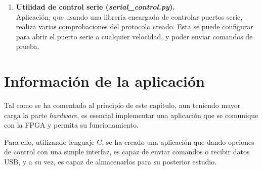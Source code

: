\begin{enumerate}
    \item \textbf{Utilidad de control serie (\emph{serial\_control.py}).} \\
    Aplicación, que usando una librería encargada de controlar puertos serie, realiza varias comprobaciones del protocolo creado. Esta se puede configurar para abrir el puerto serie a cualquier velocidad, y poder enviar comandos de prueba.
\end{enumerate}

\section{Información de la aplicación}
Tal como se ha comentado al principio de este capítulo, aun teniendo mayor carga la parte \emph{hardware}, es esencial implementar una aplicación que se comunique con la FPGA y permita su funcionamiento.

Para ello, utilizando lenguaje C, se ha creado una aplicación que dando opciones de control con una simple interfaz, es capaz de enviar comandos o recibir datos USB, y a su vez, es capaz de almacenarlos para su posterior estudio.

